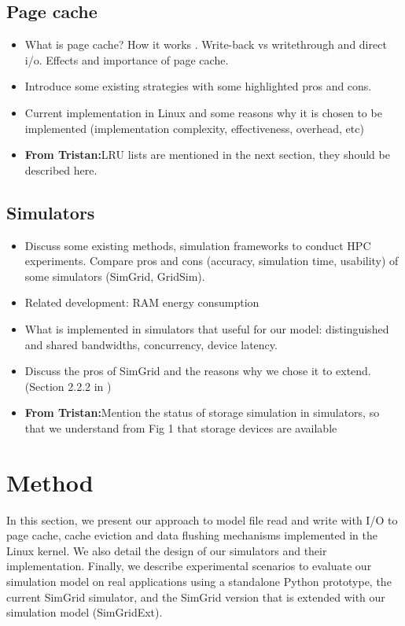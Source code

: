 \documentclass[conference]{IEEEtran}
\newcommand{\tristan}[1]{\color{orange}\textbf{From Tristan:}#1\color{black}}
\begin{document}
		\subsection{Page cache}
			\begin{itemize}
				\item What is page cache? How it works \cite{linuxdev3rd2010}. 
				Write-back vs writethrough and direct i/o. Effects and importance of page cache.
				\item Introduce some existing strategies with some highlighted pros and cons.
				\item Current implementation in Linux and some reasons why it is chosen to be implemented (implementation complexity, effectiveness, overhead, etc) \cite{linuxdev3rd2010}
				\item \tristan{LRU lists are mentioned in the next section, they should be described here.}
			\end{itemize}									

		\subsection{Simulators}
			\begin{itemize}
				\item Discuss some existing methods, simulation frameworks to conduct HPC experiments. Compare pros and cons (accuracy, simulation time, usability) of some simulators (SimGrid, GridSim).
				\item Related development: RAM energy consumption \cite{gill2019} \cite{ouarnoughi2017} 
				\item What is implemented in simulators that useful for our model:
				distinguished and shared bandwidths, concurrency, device latency. 
				\item Discuss the pros of SimGrid and the reasons why we chose it to extend. (Section 2.2.2 in \cite{casanova2014})
				\item \tristan{Mention the status of storage simulation in simulators, so that we understand from Fig 1 that storage devices are available}
			\end{itemize}
			
	\section{Method}

		In this section, we present our approach to model file read and write with
		I/O to page cache, cache eviction and data flushing mechanisms implemented 
		in the Linux kernel. We also detail the design of our simulators and their
		implementation. Finally, we describe experimental scenarios to evaluate
		our simulation model on real applications using a standalone Python
		prototype, the current SimGrid simulator, and the SimGrid version that is 
		extended with our simulation model (SimGridExt).
\end{document}
